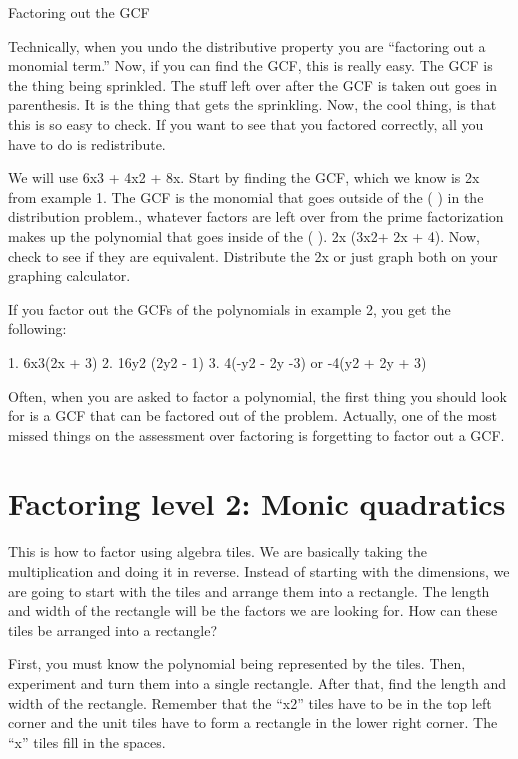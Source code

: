 Factoring out the GCF

Technically, when you undo the distributive property you are ``factoring out a monomial term.'' Now, if you can find the GCF, this is really easy. The GCF is the thing being sprinkled. The stuff left over after the GCF is taken out goes in parenthesis. It is the thing that gets the sprinkling. Now, the cool thing, is that this is so easy to check. If you want to see that you factored correctly, all you have to do is redistribute.

We will use 6x3 + 4x2 + 8x. Start by finding the GCF, which we know is 2x from example 1. The GCF is the monomial that goes outside of the ( ) in the distribution problem., whatever factors are left over from the prime factorization makes up the polynomial that goes inside of the ( ). 2x (3x2+ 2x + 4). Now, check to see if they are equivalent. Distribute the 2x or just graph both on your graphing calculator. 

If you factor out the GCFs of the polynomials in example 2, you get the following:

1. 6x3(2x + 3)
2. 16y2 (2y2 - 1)
3. 4(-y2 - 2y -3) or -4(y2 + 2y + 3)

Often, when you are asked to factor a polynomial, the first thing you should look for is a GCF that can be factored out of the problem. Actually, one of the most missed things on the assessment over factoring is forgetting to factor out a GCF. 

\section{Factoring level 2: Monic quadratics}

This is how to factor using algebra tiles. We are basically taking the multiplication and doing it in reverse. Instead of starting with the dimensions, we are going to start with the tiles and arrange them into a rectangle. The length and width of the rectangle will be the factors we are looking for.
How can these tiles be arranged into a rectangle?



First, you must know the polynomial being represented by the tiles. Then, experiment and turn them into a single rectangle. After that, find the length and width of the rectangle. Remember that the ``x2'' tiles have to be in the top left corner and the unit tiles have to form a rectangle in the lower right corner. The ``x'' tiles fill in the spaces.



